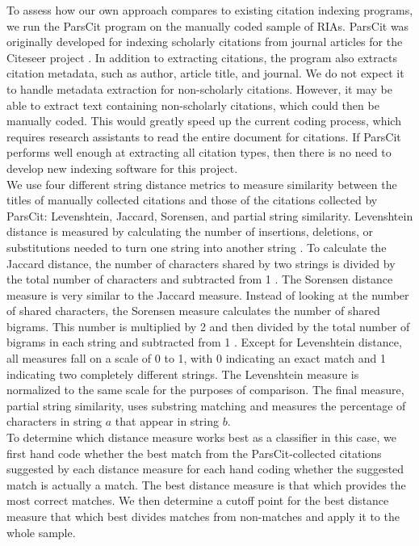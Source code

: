 \documentclass[12pt]{article}
\begin{document}
To assess how our own approach compares to existing citation indexing programs, we run the ParsCit program on the manually coded sample of RIAs. ParsCit was originally developed for indexing scholarly citations from journal articles for the Citeseer project \cite{councilletal2008}. In addition to extracting citations, the program also extracts citation metadata, such as author, article title, and journal. We do not expect it to handle metadata extraction for non-scholarly citations. However, it may be able to extract text containing non-scholarly citations, which could then be manually coded. This would greatly speed up the current coding process, which requires research assistants to read the entire document for citations. If ParsCit performs well enough at extracting all citation types, then there is no need to develop new indexing software for this project.\\

We use four different string distance metrics to measure similarity between the titles of manually collected citations and those of the citations collected by ParsCit: Levenshtein, Jaccard, Sorensen, and partial string similarity. Levenshtein distance is measured by calculating the number of insertions, deletions, or substitutions needed to turn one string into another string \cite{levenshtein1966}. To calculate the Jaccard distance, the number of characters shared by two strings is divided by the total number of characters and subtracted from 1 \cite{jaccard1901}. The Sorensen distance measure is very similar to the Jaccard measure. Instead of looking at the number of shared characters, the Sorensen measure calculates the number of shared bigrams. This number is multiplied by 2 and then divided by the total number of bigrams in each string and subtracted from 1 \cite{sorensen1948}. Except for Levenshtein distance, all measures fall on a scale of 0 to 1, with 0 indicating an exact match and 1 indicating two completely different strings. The Levenshtein measure is normalized to the same scale for the purposes of comparison. The final measure, partial string similarity, uses substring matching and measures the percentage of characters in string $a$ that appear in string $b$.\\

To determine which distance measure works best as a classifier in this case, we first hand code whether the best match from the ParsCit-collected citations suggested by each distance measure for each hand coding whether the suggested match is actually a match. The best distance measure is that which provides the most correct matches. We then determine a cutoff point for the best distance measure that which best divides matches from non-matches and apply it to the whole sample.\\
\end{document}
